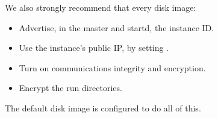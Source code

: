 We also strongly recommend that every  disk image:

\begin{itemize}
\item  Advertise, in the master and startd, the instance ID.
\item  Use the instance's public IP, by setting .
\item  Turn on communications integrity and encryption.
\item  Encrypt the run directories.
\end{itemize}

The default disk image is configured to do all of this.
